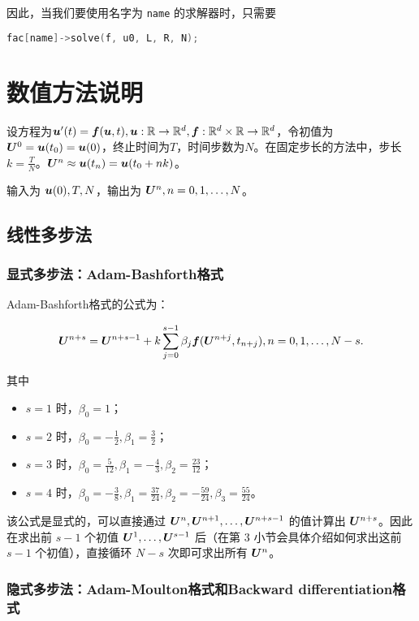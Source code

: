 \documentclass[lang=cn,a4paper,newtx,bibend=bibtex]{elegantpaper}
\begin{document}
因此，当我们要使用名字为 \texttt{name} 的求解器时，只需要
\begin{lstlisting}[language=C++]
    fac[name]->solve(f, u0, L, R, N);
\end{lstlisting}

\newpage
\section{数值方法说明}

设方程为$\bm{u}'(t) = \bm{f}(\bm{u}, t), \bm{u}: \mathbb{R}\rightarrow \mathbb{R}^d, \bm{f}: \mathbb{R}^d\times \mathbb{R}\rightarrow \mathbb{R}^d$，令初值为$\bm{U}^0=\bm{u}(t_0)=\bm{u}(0)$，终止时间为$T$，时间步数为$N$。在固定步长的方法中，步长$k=\frac TN$。$\bm{U}^n \approx \bm{u}(t_n) = \bm{u}(t_0+nk)$。

输入为 $\bm{u}(0), T, N$，输出为 $\bm{U}^n, n=0,1,\dots,N$。

\subsection{线性多步法}

\subsubsection{显式多步法：Adam-Bashforth格式}

Adam-Bashforth格式的公式为：

\begin{equation*}
    \bm{U}^{n+s} = \bm{U}^{n+s-1} + k\sum_{j=0}^{s-1} \beta_j\bm{f}(\bm{U}^{n+j}, t_{n+j}), n = 0, 1, \dots, N-s. 
\end{equation*}

其中
\begin{itemize}
    \item $s=1$ 时，$\beta_0 = 1$；
    \item $s=2$ 时，$\beta_0 = -\frac 12, \beta_1 = \frac 32$；
    \item $s=3$ 时，$\beta_0 = \frac{5}{12}, \beta_1 = -\frac 43, \beta_2 = \frac{23}{12}$；
    \item $s=4$ 时，$\beta_0 = -\frac 38, \beta_1 = \frac{37}{24}, \beta_2 = -\frac{59}{24}, \beta_3 = \frac{55}{24}$。
\end{itemize}

该公式是显式的，可以直接通过 $\bm{U}^n, \bm{U}^{n+1},\dots, \bm{U}^{n+s-1}$ 的值计算出 $\bm{U}^{n+s}$。因此在求出前 $s-1$ 个初值 $\bm{U}^1, \dots, \bm{U}^{s-1}$ 后（在第 3 小节会具体介绍如何求出这前 $s-1$ 个初值），直接循环 $N-s$ 次即可求出所有 $\bm{U}^n$。

\subsubsection{隐式多步法：Adam-Moulton格式和Backward differentiation格式}
\end{document}
